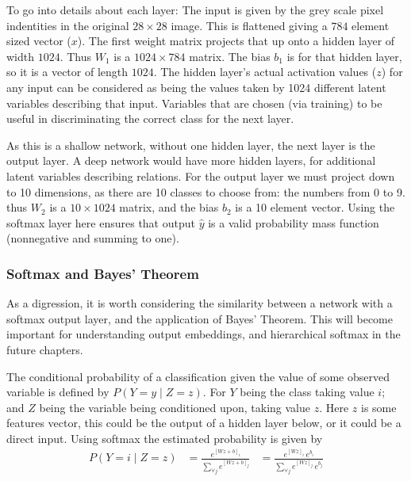 \documentclass[12pt,parskip]{komatufte}\right
\begin{document}

To go into details about each layer:
The input is given by the grey scale pixel indentities in the original $28\times 28$ image.
This is flattened giving a $784$ element sized vector ($x$).
The first weight matrix projects that up onto a hidden layer  of width $1024$.
Thus $W_1$ is a $1024\times 784$ matrix.
The bias $b_1$ is for that hidden layer, so it is a vector of length $1024$.
The hidden layer's actual activation values ($z$) for any input can be considered as being the values taken by 1024 different latent variables describing that input.
Variables that are chosen (via training) to be useful in discriminating the correct class for the next layer.

As this is a shallow network, without one hidden layer, the next layer is the output layer.
A deep network would have more hidden layers, for additional latent variables describing relations.
For the output layer we must project down to 10 dimensions, as there are 10 classes to choose from: the numbers from 0 to 9.
thus $W_2$ is a $10 \times 1024$ matrix,
and the bias $b_2$ is a 10 element vector.
Using the softmax layer here ensures that output $\hat{y}$ is a valid probability mass function (nonnegative and summing to one).


\subsubsection{Softmax and Bayes' Theorem}\label{sec:softmax-and-bayes-theorem}
As a digression, it is worth considering the similarity between a network with a softmax output layer, and the application of Bayes' Theorem.
This will become important for understanding output embeddings, and hierarchical softmax in the future chapters.

The conditional probability of a classification given the value of some observed variable is defined by $P(Y=y\mid Z=z)$.
For $Y$ being the class taking value $i$;
and $Z$ being the variable being conditioned upon, taking value $z$.
Here $z$  is some features vector, this could be the output of a hidden layer below, or it could be a direct input.
Using softmax the estimated probability is given by
\begin{align} 
P(Y=i\mid Z=z)&=\frac{e^{[Wz+b]_{i}}}{\sum_{\forall j}e^{[Wz+b]_{j}}}
&=\frac{e^{[Wz]_{i}}\,e^{b_{i}}}{\sum_{\forall j}e^{[Wz]_{j}}\,e^{b_{j}}}
\end{align}
\end{document}
